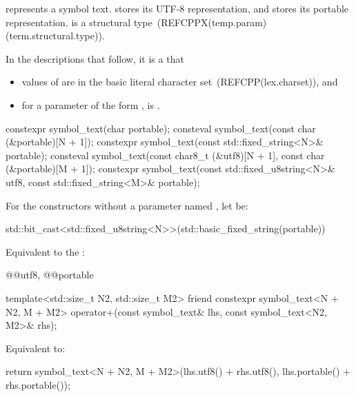 \pnum
{} represents a symbol text.
 stores its UTF-8 representation, and
 stores its portable representation.
 is a structural type~(REFCPPX(temp.param)(term.structural.type)).

\pnum
In the descriptions that follow,
it is a  that
\begin{itemize}
\item
values of  are in the basic literal character set~(REFCPP(lex.charset)), and
\item
for a parameter of the form ,
 is .
\end{itemize}

\begin{itemdecl}
constexpr symbol_text(char portable);
consteval symbol_text(const char (&portable)[N + 1]);
constexpr symbol_text(const std::fixed_string<N>& portable);
consteval symbol_text(const char8_t (&utf8)[N + 1], const char (&portable)[M + 1]);
constexpr symbol_text(const std::fixed_u8string<N>& utf8, const std::fixed_string<M>& portable);
\end{itemdecl}

\begin{itemdescr}
\pnum
For the constructors without a parameter named ,
let  be:
\begin{codeblock}
std::bit_cast<std::fixed_u8string<N>>(std::basic_fixed_string(portable))
\end{codeblock}

\pnum
\effects
Equivalent to the :
\begin{codeblock}
@@{utf8}, @@{portable}
\end{codeblock}
\end{itemdescr}

\begin{itemdecl}
template<std::size_t N2, std::size_t M2>
friend constexpr symbol_text<N + N2, M + M2> operator+(const symbol_text& lhs,
                                                       const symbol_text<N2, M2>& rhs);
\end{itemdecl}

\begin{itemdescr}
\pnum
\effects
Equivalent to:
\begin{codeblock}
return symbol_text<N + N2, M + M2>(lhs.utf8() + rhs.utf8(),
                                   lhs.portable() + rhs.portable());
\end{codeblock}
\end{itemdescr}

